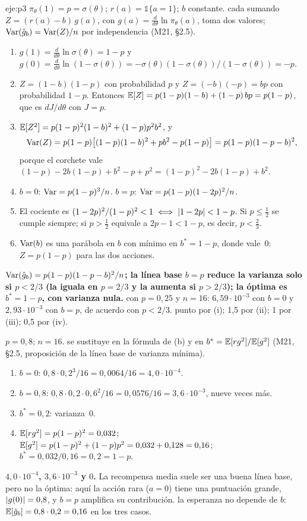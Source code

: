 \begin{solucion}{eje:p3}
\datos $\pi_\theta(1)=p=\sigma(\theta)$; $r(a)=\mathbb{1}\{a=1\}$; $b$ constante.
\planteamiento cada sumando $Z=(r(a)-b)\,g(a)$, con $g(a)=\frac{d}{d\theta}\ln\pi_\theta(a)$, toma dos valores; $\operatorname{Var}(\hat g_b)=\operatorname{Var}(Z)/n$ por independencia (M21, §2.5).
\pasos
\begin{enumerate}[label=\arabic*.]
  \item $g(1)=\frac{d}{d\theta}\ln\sigma(\theta)=1-p$ y $g(0)=\frac{d}{d\theta}\ln(1-\sigma(\theta))=-\sigma(\theta)(1-\sigma(\theta))/(1-\sigma(\theta))=-p$.
  \item $Z=(1-b)(1-p)$ con probabilidad $p$ y $Z=(-b)(-p)=bp$ con probabilidad $1-p$. Entonces $\mathbb{E}[Z]=p(1-p)(1-b)+(1-p)\,bp=p(1-p)$, que es $dJ/d\theta$ con $J=p$.
  \item $\mathbb{E}[Z^{2}]=p(1-p)^{2}(1-b)^{2}+(1-p)p^{2}b^{2}$, y
  \[
  \operatorname{Var}(Z)=p(1-p)\bigl[(1-p)(1-b)^{2}+pb^{2}-p(1-p)\bigr]=p(1-p)(1-p-b)^{2},
  \]
  porque el corchete vale $(1-p)-2b(1-p)+b^{2}-p+p^{2}=(1-p)^{2}-2b(1-p)+b^{2}$.
  \item $b=0$: $\operatorname{Var}=p(1-p)^{3}/n$. $b=p$: $\operatorname{Var}=p(1-p)(1-2p)^{2}/n$.
  \item El cociente es $(1-2p)^{2}/(1-p)^{2}<1\iff\lvert1-2p\rvert<1-p$. Si $p\le\frac12$ se cumple siempre; si $p>\frac12$ equivale a $2p-1<1-p$, es decir, $p<\frac23$.
  \item $\operatorname{Var}(b)$ es una parábola en $b$ con mínimo en $b^{*}=1-p$, donde vale~0: $Z=p(1-p)$ para las dos acciones.
\end{enumerate}
\resultado \textbf{$\operatorname{Var}(\hat g_b)=p(1-p)(1-p-b)^{2}/n$; la línea base $b=p$ reduce la varianza solo si $p<2/3$ (la iguala en $p=2/3$ y la aumenta si $p>2/3$); la óptima es $b^{*}=1-p$, con varianza nula.}
\comprobacion con $p=0{,}25$ y $n=16$: $6{,}59\cdot 10^{-3}$ con $b=0$ y $2{,}93\cdot 10^{-3}$ con $b=p$, de acuerdo con $p<2/3$.
 punto por (i); 1,5 por (ii); 1 por (iii); 0,5 por (iv).

\datos $p=0{,}8$; $n=16$.
\planteamiento se sustituye en la fórmula de (b) y en $b^{*}=\mathbb{E}[rg^{2}]/\mathbb{E}[g^{2}]$ (M21, §2.5, proposición de la línea base de varianza mínima).
\pasos
\begin{enumerate}[label=\arabic*.]
  \item $b=0$: $0{,}8\cdot 0{,}2^{3}/16=0{,}0064/16=4{,}0\cdot 10^{-4}$.
  \item $b=0{,}8$: $0{,}8\cdot 0{,}2\cdot 0{,}6^{2}/16=0{,}0576/16=3{,}6\cdot 10^{-3}$, nueve veces más.
  \item $b^{*}=0{,}2$: varianza~0.
  \item $\mathbb{E}[rg^{2}]=p(1-p)^{2}=0{,}032$; $\mathbb{E}[g^{2}]=p(1-p)^{2}+(1-p)p^{2}=0{,}032+0{,}128=0{,}16$; $b^{*}=0{,}032/0{,}16=0{,}2=1-p$.
\end{enumerate}
\resultado \textbf{$4{,}0\cdot 10^{-4}$, $3{,}6\cdot 10^{-3}$ y $0$.} La recompensa media suele ser una buena línea base, pero no la óptima: aquí la acción rara ($a=0$) tiene una puntuación grande, $\lvert g(0)\rvert=0{,}8$, y $b=p$ amplifica su contribución.
\comprobacion la esperanza no depende de $b$: $\mathbb{E}[\hat g_b]=0{,}8\cdot 0{,}2=0{,}16$ en los tres casos.
\end{solucion}

